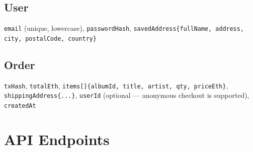 \documentclass[11pt, a4paper]{report}
\begin{document}
\subsection*{User}

\texttt{email} (unique, lowercase), \texttt{passwordHash}, \texttt{savedAddress\{fullName, address, city, postalCode, country\}}

\subsection*{Order}

\texttt{txHash}, \texttt{totalEth}, \texttt{items[]\{albumId, title, artist, qty, priceEth\}}, \texttt{shippingAddress\{...\}}, \texttt{userId} (optional — anonymous checkout is supported), \texttt{createdAt}

\section{API Endpoints}
\end{document}
